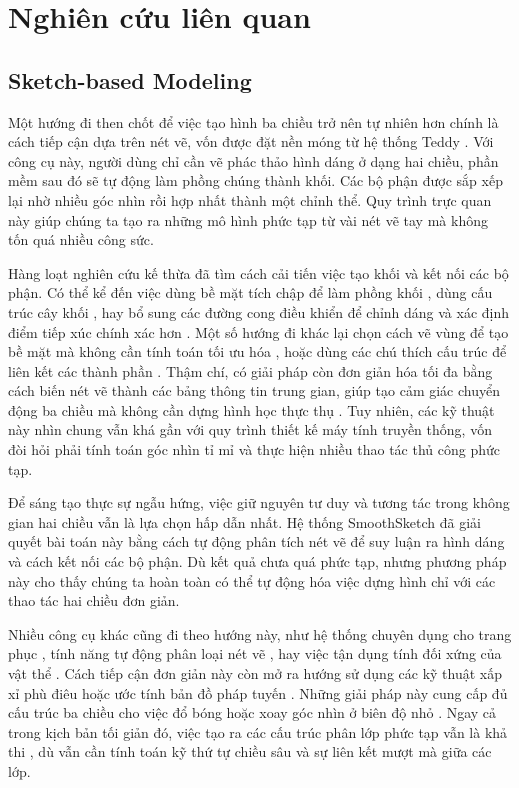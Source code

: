 \documentclass{report}
\begin{document}
\chapter{Nghiên cứu liên quan}
\section{Sketch-based Modeling} 
Một hướng đi then chốt để việc tạo hình ba chiều trở nên tự nhiên hơn chính là cách tiếp cận dựa trên nét vẽ, vốn được đặt nền móng từ hệ thống Teddy \citep{Igarashi1999}. Với công cụ này, người dùng chỉ cần vẽ phác thảo hình dáng ở dạng hai chiều, phần mềm sau đó sẽ tự động làm phồng chúng thành khối. Các bộ phận được sắp xếp lại nhờ nhiều góc nhìn rồi hợp nhất thành một chỉnh thể. Quy trình trực quan này giúp chúng ta tạo ra những mô hình phức tạp từ vài nét vẽ tay mà không tốn quá nhiều công sức.

Hàng loạt nghiên cứu kế thừa đã tìm cách cải tiến việc tạo khối và kết nối các bộ phận. Có thể kể đến việc dùng bề mặt tích chập để làm phồng khối \citep{Tai2004}, dùng cấu trúc cây khối \citep{Schmidt2005}, hay bổ sung các đường cong điều khiển để chỉnh dáng và xác định điểm tiếp xúc chính xác hơn \citep{Nealen2007}. Một số hướng đi khác lại chọn cách vẽ vùng để tạo bề mặt mà không cần tính toán tối ưu hóa \citep{Bernhardt2008}, hoặc dùng các chú thích cấu trúc để liên kết các thành phần \citep{Gingold2009}. Thậm chí, có giải pháp còn đơn giản hóa tối đa bằng cách biến nét vẽ thành các bảng thông tin trung gian, giúp tạo cảm giác chuyển động ba chiều mà không cần dựng hình học thực thụ \citep{Rivers2010}. Tuy nhiên, các kỹ thuật này nhìn chung vẫn khá gần với quy trình thiết kế máy tính truyền thống, vốn đòi hỏi phải tính toán góc nhìn tỉ mỉ và thực hiện nhiều thao tác thủ công phức tạp.

Để sáng tạo thực sự ngẫu hứng, việc giữ nguyên tư duy và tương tác trong không gian hai chiều vẫn là lựa chọn hấp dẫn nhất. Hệ thống SmoothSketch \citep{Karpenko2006} đã giải quyết bài toán này bằng cách tự động phân tích nét vẽ để suy luận ra hình dáng và cách kết nối các bộ phận. Dù kết quả chưa quá phức tạp, nhưng phương pháp này cho thấy chúng ta hoàn toàn có thể tự động hóa việc dựng hình chỉ với các thao tác hai chiều đơn giản.

Nhiều công cụ khác cũng đi theo hướng này, như hệ thống chuyên dụng cho trang phục \citep{Turquin2007}, tính năng tự động phân loại nét vẽ \citep{Olsen2011}, hay việc tận dụng tính đối xứng của vật thể \citep{Cordier2011}. Cách tiếp cận đơn giản này còn mở ra hướng sử dụng các kỹ thuật xấp xỉ phù điêu \citep{Joshi2008} hoặc ước tính bản đồ pháp tuyến \citep{Tuan2015}. Những giải pháp này cung cấp đủ cấu trúc ba chiều cho việc đổ bóng hoặc xoay góc nhìn ở biên độ nhỏ \citep{Yeh2017}. Ngay cả trong kịch bản tối giản đó, việc tạo ra các cấu trúc phân lớp phức tạp vẫn là khả thi \citep{Dvoroznak2018, Sykora2014}, dù vẫn cần tính toán kỹ thứ tự chiều sâu và sự liên kết mượt mà giữa các lớp.
\end{document}
